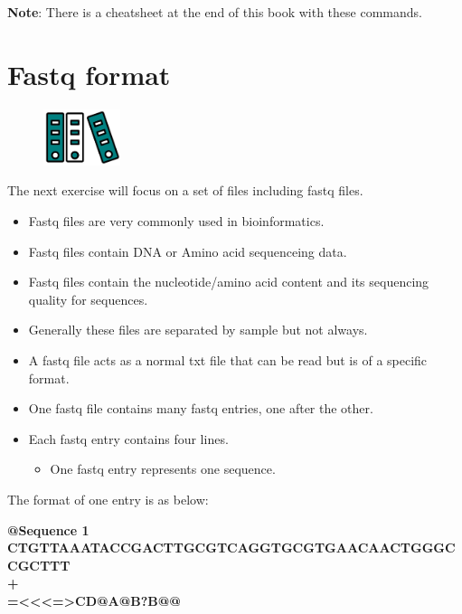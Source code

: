 \documentclass[
  letterpaper,
  DIV=11,
  numbers=noendperiod]{scrreprt}
\providecommand{\tightlist}{%
  \setlength{\itemsep}{0pt}\setlength{\parskip}{0pt}}\usepackage{longtable,booktabs,array}
\begin{document}
\textbf{Note}: There is a cheatsheet at the end of this book with these
commands.

\hypertarget{fastq-format}{%
\chapter{Fastq format}\label{fastq-format}}

\begin{figure}

{\centering \includegraphics[width=0.2\textwidth,height=\textheight]{figures/files.png}

}

\end{figure}

The next exercise will focus on a set of files including fastq files.

\begin{itemize}
\tightlist
\item
  Fastq files are very commonly used in bioinformatics.
\item
  Fastq files contain DNA or Amino acid sequenceing data.
\item
  Fastq files contain the nucleotide/amino acid content and its
  sequencing quality for sequences.
\item
  Generally these files are separated by sample but not always.
\item
  A fastq file acts as a normal txt file that can be read but is of a
  specific format.
\item
  One fastq file contains many fastq entries, one after the other.
\item
  Each fastq entry contains four lines.

  \begin{itemize}
  \tightlist
  \item
    One fastq entry represents one sequence.
  \end{itemize}
\end{itemize}

The format of one entry is as below:

\textbf{@Sequence 1}\\
\textbf{CTGTTAAATACCGACTTGCGTCAGGTGCGTGAACAACTGGGCCGCTTT}\\
\textbf{+}\\
\textbf{=\textless\textless\textless=\textgreater@@@ACDCBCDAC@BAA@BA@BBCBBDA@BB@\textgreater CD@A@B?B@@}
\end{document}
